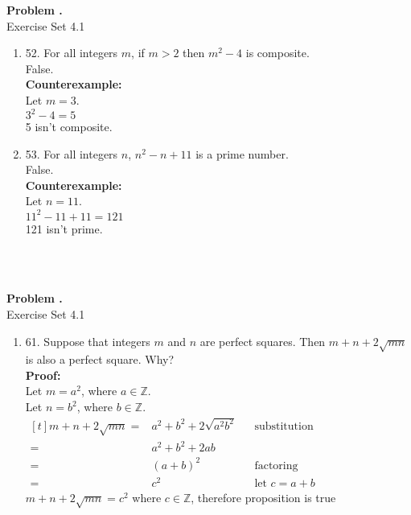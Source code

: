 \documentclass[letterpaper,fleqn]{article}
\begin{document}
	\setcounter{pcount}{1}
	
	\newcommand{\rawproblem}[1]{
		\noindent\begin{minipage}{\textwidth}
			\textbf{Problem \thepcount\stepcounter{pcount}.} \\
			#1
		\end{minipage} \\
		\\
	}
	\newcommand{\problem}[2]{
		\rawproblem{
		Exercise Set 4.#1
		\begin{enumerate}
			#2
		\end{enumerate}
		}
	}
	
	\newcommand{\case}[2]{\cellcolor{yellow!25}\textbf{Case #1:} #2}
	\newcommand{\theorem}[2]{
		\cellcolor{green!25}\textbf{Theorem #1:} \\
		\hline
		#2
	}
	
	\problem{1}{
	\item [52.]
	For all integers $m$, if $m>2$ then $m^2-4$ is composite. \\
	False. \\
	\textbf{Counterexample:} \\
	Let $m=3$. \\
	$3^2-4=5$ \\
	5 isn't composite.
	
	\item [53.]
	For all integers $n$, $n^2-n+11$ is a prime number. \\
	False. \\
	\textbf{Counterexample:} \\
	Let $n=11$. \\
	$11^2-11+11=121$ \\
	121 isn't prime.
	}
	
	\problem{1}{
	\item [61.]
	Suppose that integers $m$ and $n$ are perfect squares. Then $m+n+2\sqrt{mn}$ is also a perfect square. Why? \\
	\textbf{Proof:} \\
	Let $m=a^2$, where $a \in \mathbb{Z}$. \\
	Let $n=b^2$, where $b \in \mathbb{Z}$. \\
	$\begin{aligned}[t]
		m+n+2\sqrt{mn} ={} & a^2+b^2+2\sqrt{a^2b^2}  && \text{substitution} \\
		={} & a^2+b^2+2ab \\
		={} & (a+b)^2 && \text{factoring} \\
		={} & c^2 && \text{let $c=a+b$}
	\end{aligned}$ \\
	$m+n+2\sqrt{mn}=c^2$ where $c \in \mathbb{Z}$, therefore proposition is true
	}
	
\end{document}
